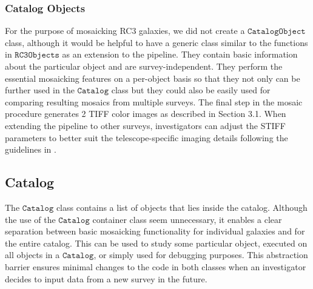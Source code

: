\documentclass[5p]{elsarticle}
\begin{document}
	\subsubsection{Catalog Objects}
	For the purpose of mosaicking RC3 galaxies, we did not create a $\texttt{CatalogObject}$ class, although it would be helpful to have a generic class similar to the functions in $\texttt{RC3Objects}$ as an extension to the pipeline. They contain basic information about the particular object and are survey-independent. They perform the essential mosaicking features on a per-object basis so that  they not only can  be further used in the $\texttt{Catalog}$ class but they could also be easily used for comparing resulting mosaics from multiple surveys. The final step in the mosaic procedure generates 2 TIFF color images as described in Section  3.1\label{sec:tiff_color}.  When extending the pipeline to other surveys, investigators can adjust the STIFF parameters to better suit the telescope-specific imaging details following the guidelines in \citet{stiff}.
    \subsection{Catalog}
	The $\texttt{Catalog}$ class contains a list of objects that lies inside the catalog. Although the use of the $\texttt{Catalog}$ container class seem unnecessary, it enables a clear separation between basic mosaicking functionality for individual galaxies and for the entire catalog. This can be used to study some particular object, executed on all objects in a $\texttt{Catalog}$, or simply used for debugging purposes. This abstraction barrier ensures minimal changes to the code in both classes when an investigator decides to input data from a new survey in the future.
\end{document}
